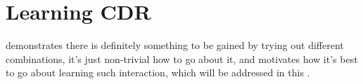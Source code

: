 \documentclass[smallextended]{svjour3}
\begin{document}

\section{Learning CDR}\label{ch:expr:CDR}
 demonstrates there is definitely something to be gained by
trying out different combinations, it's just non-trivial how to go about it,
and motivates how it's best to go about learning such interaction, which will
be addressed in this .
\end{document}
